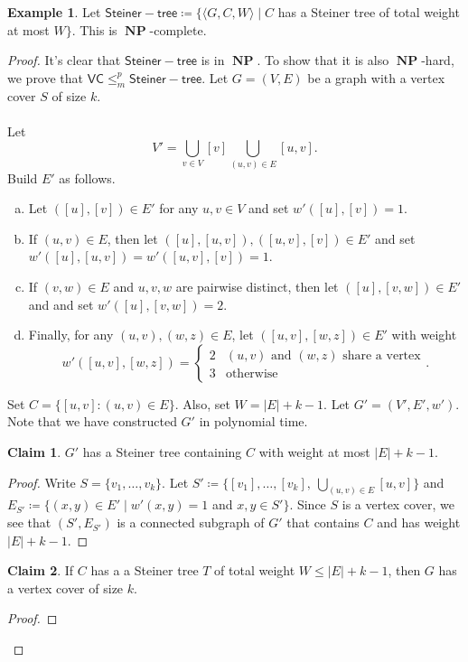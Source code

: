\documentclass[10pt,letterpaper,cm]{nupset}
\theoremstyle{definition}
\newtheorem{exmp}{Example}
\newtheorem{claim}{Claim}
\newcommand{\1}{\mathbf{1}}
\newcommand{\0}{\vec 0}
\DeclareMathOperator{\NP}{\mathbf{NP}}
\begin{document}
\begin{exmp}
Let $\mathsf{Steiner{-}tree} \coloneqq \{\langle G, C, W \rangle \mid C$ has a Steiner tree of total weight at most $W\}$. This is $\NP$-complete.
\end{exmp}
\begin{proof}
It's clear that $\mathsf{Steiner{-}tree} $ is in $\NP$. To show that it is also $\NP$-hard, we prove that $\mathsf{VC} \leq_m^p \mathsf{Steiner{-}tree} $. Let $G = (V, E)$ be a graph with a vertex cover $S$ of size $k$. 
\\ \\ Let $$V' = \bigcup_{v \in V} [v] \bigcup_{(u,v) \in E}[u,v].$$ Build $E'$ as follows. 
\begin{enumerate}[(a)]
\item Let $([u], [v])\in E'$ for any $u,v \in V$ and set $w'([u], [v])=1$. 
\item If $(u,v) \in E$, then let $([u], [u,v]), ([u, v], [v]) \in E'$ and set $w'([u], [u,v]) = w'([u,v], [v]) =1$. 
\item If $(v,w) \in E$ and $u,v,w$ are pairwise distinct, then let $([u], [v,w]) \in E'$ and and set $w'([u], [v,w]) = 2$.
\item Finally, for any $(u,v), (w,z) \in E$, let $([u,v], [w,z])\in E'$  with weight $$w'([u,v], [w,z]) = \begin{cases} 2 & (u,v) \text{ and } (w,z) \text{ share a vertex} \\ 3 & \text{otherwise} \end{cases}.$$ 
\end{enumerate}
Set $C = \{ [u,v] : (u,v) \in E\}$. Also, set $W= |E|+ k -1$. Let $G' = (V', E', w')$. Note that we have constructed $G'$ in polynomial time.
\begin{claim}
$G'$ has a Steiner tree containing $C$ with weight at most $|E| + k -1$.
\end{claim}
\begin{proof}
Write $S = \{v_1, \ldots, v_k\}$. Let $S' \coloneqq \{[v_1], \ldots, [v_k], \ \bigcup_{(u,v) \in E}[u,v]\}$ and $E_{S'} \coloneqq \{ (x,y)\in E' \mid w'(x,y)=1$ and $x,y\in S'\}$. Since $S$ is a vertex cover, we see that $(S', E_{S'})$ is a connected subgraph of $G'$ that contains $C$ and has weight $|E|+k -1$.
\end{proof}
\begin{claim}
If $C$ has a a Steiner tree $T$ of total weight $W \leq |E| +k -1$, then $G$ has a vertex cover of size $k$. 
\end{claim}
\begin{proof}

\end{proof}
\end{proof}
\end{document}
